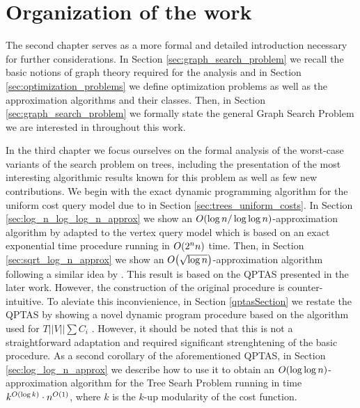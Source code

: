 
\section{Organization of the work}
The second chapter serves as a more formal and detailed introduction necessary for further considerations. In Section \ref{sec:graph_search_problem} we recall the basic notions of graph theory required for the analysis and in Section \ref{sec:optimization_problems} we define optimization problems as well as the approximation algorithms and their classes. Then, in Section \ref{sec:graph_search_problem} we formally state the general Graph Search Problem we are interested in throughout this work.

In the third chapter we focus ourselves on the formal analysis of the worst-case variants of the search problem on trees, including the presentation of the most interesting algorithmic results known for this problem as well as few new contributions. We begin with the exact dynamic programming algorithm for the uniform cost query  model due to \cite{OnakParys2006GenOfBSSInTsAndFLikePosets,Mozes_Onak2008FindOptTSStartInLinTime} in Section \ref{sec:trees_uniform_costs}.
In Section \ref{sec:log_n_log_log_n_approx} we show an $O\mathopen{}\left( \log n/\log \log n \right)$-approximation algorithm by \cite{Cicalese2016OnTSPwNonUniCost} adapted to the vertex query model which is based on an exact exponential time procedure running in $O\mathopen{}\left( 2^nn \right)$ time. Then, in Section \ref{sec:sqrt_log_n_approx} we show an $O\mathopen{}\left( \sqrt{\log n} \right)$-approximation algorithm following a similar idea by \cite{dereniowski2017ApproxSsForGeneralBSinWTs}. This result is based on the QPTAS presented in the later work. However, the construction of the original procedure is counter-intuitive. To aleviate this inconvienience, in Section \ref{qptasSection} we restate the QPTAS by showing a novel dynamic program procedure based on the algorithm used for $T||V||\sum C_i$ \cite{Jacobs2010OnTheComplexSearchInTsAvg,Angelidakis2018ShortestPQ}. However, it should be noted that this is not a straightforward adaptation and required significant strenghtening of the basic procedure. As a second corollary of the aforementioned QPTAS, in Section \ref{sec:log_log_n_approx} we describe how to use it to obtain an $O\mathopen{}\left( \log \log n \right)$-approximation algorithm for the Tree Searh Problem running in time $k^{O\mathopen{}\left( \log k \right)}\cdot n^{O\mathopen{}\left( 1 \right)}$, where $k$ is the $k$-up modularity of the cost function.

